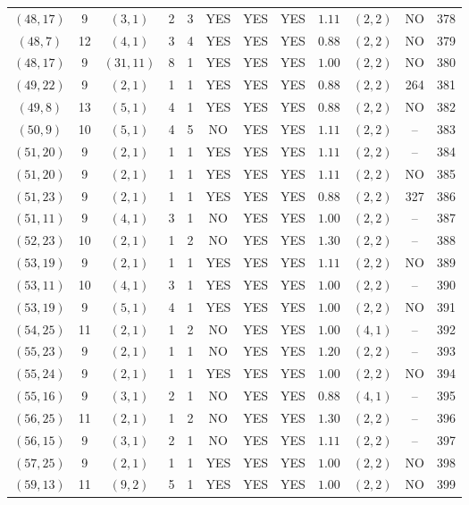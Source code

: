 \begin{longtable}{|c|c|c|c|c|c|c|c|c|c|c|c|}
$(48,17)$ & 9 & $(3,1)$ & 2 & 3 & YES & YES & YES & $1.11$ & $(2,2)$ & NO & 378\\
$(48,7)$ & 12 & $(4,1)$ & 3 & 4 & YES & YES & YES & $0.88$ & $(2,2)$ & NO & 379\\
$(48,17)$ & 9 & $(31,11)$ & 8 & 1 & YES & YES & YES & $1.00$ & $(2,2)$ & NO & 380\\
$(49,22)$ & 9 & $(2,1)$ & 1 & 1 & YES & YES & YES & $0.88$ & $(2,2)$ & 264 & 381\\
$(49,8)$ & 13 & $(5,1)$ & 4 & 1 & YES & YES & YES & $0.88$ & $(2,2)$ & NO & 382\\
$(50,9)$ & 10 & $(5,1)$ & 4 & 5 & NO & YES & YES & $1.11$ & $(2,2)$ & -- & 383\\
$(51,20)$ & 9 & $(2,1)$ & 1 & 1 & YES & YES & YES & $1.11$ & $(2,2)$ & -- & 384\\
$(51,20)$ & 9 & $(2,1)$ & 1 & 1 & YES & YES & YES & $1.11$ & $(2,2)$ & NO & 385\\
$(51,23)$ & 9 & $(2,1)$ & 1 & 1 & YES & YES & YES & $0.88$ & $(2,2)$ & 327 & 386\\
$(51,11)$ & 9 & $(4,1)$ & 3 & 1 & NO & YES & YES & $1.00$ & $(2,2)$ & -- & 387\\
$(52,23)$ & 10 & $(2,1)$ & 1 & 2 & NO & YES & YES & $1.30$ & $(2,2)$ & -- & 388\\
$(53,19)$ & 9 & $(2,1)$ & 1 & 1 & YES & YES & YES & $1.11$ & $(2,2)$ & NO & 389\\
$(53,11)$ & 10 & $(4,1)$ & 3 & 1 & YES & YES & YES & $1.00$ & $(2,2)$ & -- & 390\\
$(53,19)$ & 9 & $(5,1)$ & 4 & 1 & YES & YES & YES & $1.00$ & $(2,2)$ & NO & 391\\
$(54,25)$ & 11 & $(2,1)$ & 1 & 2 & NO & YES & YES & $1.00$ & $(4,1)$ & -- & 392\\
$(55,23)$ & 9 & $(2,1)$ & 1 & 1 & NO & YES & YES & $1.20$ & $(2,2)$ & -- & 393\\
$(55,24)$ & 9 & $(2,1)$ & 1 & 1 & YES & YES & YES & $1.00$ & $(2,2)$ & NO & 394\\
$(55,16)$ & 9 & $(3,1)$ & 2 & 1 & NO & YES & YES & $0.88$ & $(4,1)$ & -- & 395\\
$(56,25)$ & 11 & $(2,1)$ & 1 & 2 & NO & YES & YES & $1.30$ & $(2,2)$ & -- & 396\\
$(56,15)$ & 9 & $(3,1)$ & 2 & 1 & NO & YES & YES & $1.11$ & $(2,2)$ & -- & 397\\
$(57,25)$ & 9 & $(2,1)$ & 1 & 1 & YES & YES & YES & $1.00$ & $(2,2)$ & NO & 398\\
$(59,13)$ & 11 & $(9,2)$ & 5 & 1 & YES & YES & YES & $1.00$ & $(2,2)$ & NO & 399\\

\end{longtable}
